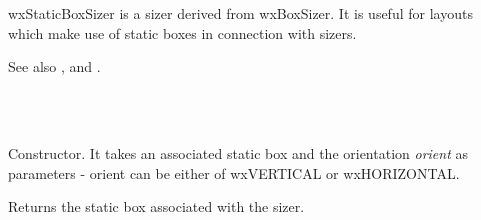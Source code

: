 \section{}\label{wxstaticboxsizer}

wxStaticBoxSizer is a sizer derived from wxBoxSizer. It is useful for
layouts which make use of static boxes in connection with sizers.

See also ,  and
  .


\\
\\


\label{wxstaticboxsizerwxstaticboxsizer}


Constructor. It takes an associated static box and the orientation {\it orient}
as parameters - orient can be either of wxVERTICAL or wxHORIZONTAL.

\label{wxstaticboxsizergetstaticbox}


Returns the static box associated with the sizer.